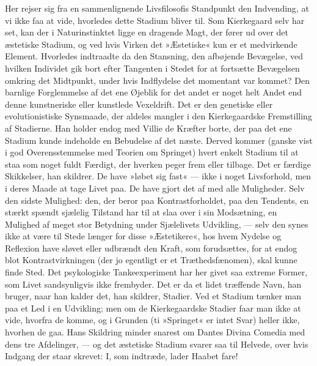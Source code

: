 \documentclass[12pt,a4paper,openany]{book}
\newcommand{\opage}[1]{\marginnote{\footnotesize\textit{[#1]}}}
\begin{document}
Her rejser sig fra en sammenlignende Livsfilosofis
Standpunkt den Indvending, at vi ikke faa at vide, hvorledes
dette Stadium bliver til. Som Kierkegaard selv har
set, kan der i Naturinstinktet ligge en dragende Magt,
der fører ud over det æstetiske Stadium, og ved hvis
Virken det »Æstetiske« kun er et medvirkende Element.
Hvorledes indtraadte da den Stansning, den afbøjende
Bevægelse, ved hvilken Individet gik bort efter Tangenten
i Stedet for at fortsætte Bevægelsen omkring det Midtpunkt,
under hvis Indflydelse det momentant var kommet?
Den barnlige Forglemmelse af det ene Øjeblik for det
andet er noget helt Andet end denne kunstneriske eller
kunstlede Vexeldrift. Det er den genetiske eller evolutionistiske
Synsmaade, der aldeles mangler i den Kierkegaardske
Fremstilling af Stadierne. Han holder endog
med Villie de Kræfter borte, der paa det ene Stadium
kunde indeholde en Bebudelse af det næste. Derved kommer
(ganske vist i god Overensstemmelse med Teorien
om Springet) hvert enkelt Stadium til at staa som noget
fuldt Færdigt, der hverken peger frem eller tilbage. Det
er færdige Skikkelser, han skildrer. De have »løbet sig
fast« --- ikke i noget Livsforhold, men i deres Maade at
tage Livet paa. De have gjort det af med alle Muligheder.
Selv den sidste Mulighed: den, der beror paa
Kontrastforholdet, paa den Tendents, en stærkt spændt
sjælelig Tilstand har til at slaa over i sin Modsætning,
en Mulighed af meget stor Betydning under Sjælelivets
Udvikling, --- selv den synes ikke at være til Stede
længer for disse »Æstetikere«, hos hvem Nydelse og
Reflexion have sløvet eller udbrændt den Kraft, som
\opage{90}forudsættes, for at endog blot Kontrastvirkningen (der jo
egentligt er et Træthedsfænomen), skal kunne finde Sted.
Det psykologiske Tankeexperiment har her givet saa
extreme Former, som Livet sandsynligvis ikke frembyder.
Det er da et lidet træffende Navn, han bruger, naar han
kalder det, han skildrer, Stadier. Ved et Stadium tænker
man paa et Led i en Udvikling; men om de Kierkegaardske
Stadier faar man ikke at vide, hvorfra de komme,
og i Grunden (ti »Springet« er intet Svar) heller ikke,
hvorhen de gaa. Hans Skildring minder snarest om
Dantes Divina Comedia med dens tre Afdelinger, --- og
det æstetiske Stadium svarer saa til Helvede, over hvis
Indgang der staar skrevet: I, som indtræde, lader Haabet
fare!
\end{document}
